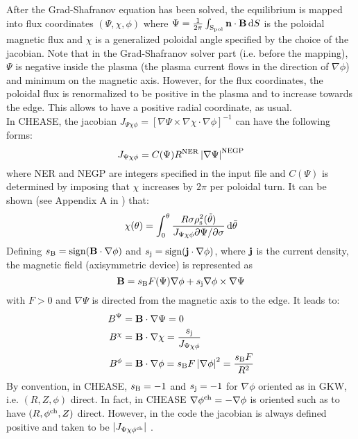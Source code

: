 \documentclass[a4paper,12pt]{article}
\newcommand{\ind}[1]{\ensuremath{_{\rm{#1}}}}
\newcommand{\expo}[1]{\ensuremath{^{\rm{#1}}}}
\begin{document}
After the Grad-Shafranov equation has been solved, the equilibrium is mapped into flux coordinates $\left(\Psi,\chi,\phi\right)$ where
$\Psi=\frac{1}{2\pi}\int\ind{S_{pol}}\textbf{n}\cdot\textbf{B}\,{\rm d}S$ is the poloidal magnetic flux and $\chi$ is a generalized poloidal angle specified by the choice of the jacobian. Note that in
the Grad-Shafranov solver part (i.e. before the mapping), $\Psi$ is negative inside the plasma (the plasma current flows in the direction of $\nabla\phi$) and minimum on the magnetic axis. However,
for the flux coordinates, the poloidal flux is renormalized to be positive in the plasma and to increase towards the edge. This allows to have a positive radial coordinate, as usual.\\
In CHEASE, the jacobian $J_{\Psi\chi\phi}=\left[\nabla\Psi\times\nabla\chi\cdot\nabla\phi\right]^{-1}$ can have the following forms:
$$J_{\Psi\chi\phi}=C(\Psi)R\expo{NER}\left|\nabla\Psi\right|\expo{NEGP}$$
where NER and NEGP are integers specified in the input file and $C(\Psi)$ is determined by imposing that $\chi$ increases by $2\pi$ per poloidal turn. It can be shown (see Appendix A in \cite{Lutjens:Comput1992}) that:  
$$\chi(\theta)=\int_0^\theta\frac{R\sigma\rho\ind{s}^2(\tilde{\theta})}{J_{\Psi\chi\phi}\partial\Psi/\partial{\sigma}}\,{\rm d}\tilde{\theta}$$
Defining $s\ind{B}=\textrm{sign}(\bf{B}\cdot\nabla\phi)$ and $s\ind{j}=\textrm{sign}(\bf{j}\cdot\nabla\phi)$, where $\bf{j}$ is the current density, the magnetic field (axisymmetric device) is
represented as 
$$\textbf{B}=s\ind{B}F(\Psi)\nabla{\phi}+s\ind{j}\nabla\phi\times\nabla\Psi$$
with $F>0$ and $\nabla\Psi$ is directed from the magnetic axis to the edge. It leads to:
\begin{equation}
\begin{aligned}
B^\Psi&=\textbf{B}\cdot\nabla\Psi=0 \nonumber \\
B^\chi&=\textbf{B}\cdot\nabla\chi=\frac{s\ind{j}}{J_{\Psi\chi\phi}} \nonumber \\
B^\phi&=\textbf{B}\cdot\nabla\phi=s\ind{B}F\left|\nabla\phi\right|^2=\frac{s\ind{B}F}{R^2} \nonumber
\end{aligned}
\end{equation}
By convention, in CHEASE, $s\ind{B}=-1$ and $s\ind{j}=-1$ for $\nabla \phi$ oriented as in GKW, i.e. $(R,Z,\phi)$ direct. In fact, in CHEASE $\nabla \phi\expo{ch}=-\nabla \phi$ is oriented
such as to have $(R,\phi\expo{ch},Z)$ direct. However, in the code the jacobian is always defined positive and taken to be $|J_{\Psi\chi\phi\expo{ch}}|$ .
\end{document}
